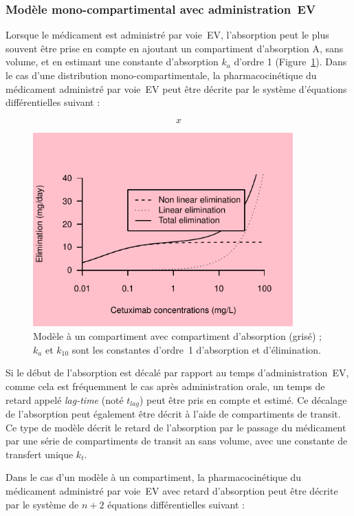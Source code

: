 \subsubsection{Modèle mono-compartimental avec administration~EV}
Lorsque le médicament est administré par voie~EV, l'absorption peut le plus souvent être prise en compte en ajoutant un compartiment d'absorption A, sans volume, et en estimant une constante d'absorption $k_{a}$ d'ordre 1 (Figure~\ref{fig:3}). Dans le cas d'une distribution mono-compartimentale, la pharmacocinétique du médicament administré par voie~EV peut être décrite par le système d'équations différentielles suivant :

\begin{equation}
x
\label{eq:19}
\end{equation}

\begin{figure}[htbp]
	\centering
		\includegraphics[width=10cm]{images/essai001.pdf}
	\caption[Modèle à un compartiment avec compartiment d'absorption]{Modèle à un compartiment avec compartiment d'absorption (grisé) ; $k_{a}$ et $k_{10}$ sont les constantes d'ordre~1 d'absorption et d'élimination.}
	\label{fig:3}
\end{figure}

Si le début de l'absorption est décalé par rapport au temps d'administration~EV, comme cela est fréquemment le cas après administration orale, un temps de retard appelé \textit{lag-time} (noté $t_{lag}$) peut être pris en compte et estimé. Ce décalage de l'absorption peut également être décrit à l'aide de compartiments de transit. Ce type de modèle décrit le retard de l'absorption par le passage du médicament par une série de compartiments de transit an sans volume, avec une constante de transfert unique $k_t$.

Dans le cas d'un modèle à un compartiment, la pharmacocinétique du médicament administré par voie~EV avec retard d'absorption peut être décrite par le système de $n+2$ équations différentielles suivant :

